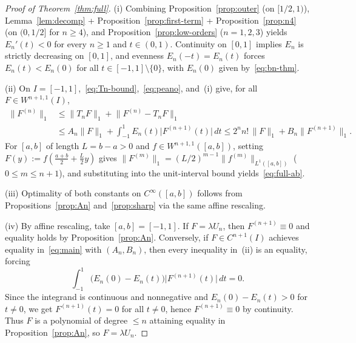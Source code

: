 \documentclass[11pt,a4paper]{article}
\newcommand{\Lone}[1]{\lVert #1\rVert_1}
\theoremstyle{remark}
\numberwithin{equation}{section}
\begin{document}
\begin{proof}[Proof of Theorem~\ref{thm:full}]
(i) Combining Proposition~\ref{prop:outer} (on $[1/2, 1)$), Lemma~\ref{lem:decomp} + Proposition~\ref{prop:first-term} + Proposition~\ref{prop:n4} (on $(0, 1/2]$ for $n \ge 4$), and Proposition~\ref{prop:low-orders} ($n = 1, 2, 3$) yields $E_n'(t) < 0$ for every $n \ge 1$ and $t \in (0,1)$. Continuity on $[0,1]$ implies $E_n$ is strictly decreasing on $[0,1]$, and evenness $E_n(-t) = E_n(t)$ forces $E_n(t) < E_n(0)$ for all $t \in [-1,1] \setminus \{0\}$, with $E_n(0)$ given by~\eqref{eq:bn-thm}.

(ii) On $I = [-1,1]$,~\eqref{eq:Tn-bound},~\eqref{eq:peano}, and~(i) give, for all $F \in W^{n+1,1}(I)$,
\begin{align*}
    \Lone{F^{(n)}}
    &\le \Lone{T_n F} + \Lone{F^{(n)} - T_n F} \\
    &\le A_n\Lone{F} + \int_{-1}^{1} E_n(t)\bigl|F^{(n+1)}(t)\bigr|\,dt
     \le 2^n n!\,\Lone{F} + B_n\Lone{F^{(n+1)}}.
\end{align*}
For $[a,b]$ of length $L = b - a > 0$ and $f \in W^{n+1,1}([a,b])$, setting $F(y) := f(\frac{a+b}{2} + \frac{L}{2}y)$ gives $\Lone{F^{(m)}} = (L/2)^{m-1}\lVert f^{(m)}\rVert_{L^1([a,b])}$ ($0 \le m \le n+1$), and substituting into the unit-interval bound yields~\eqref{eq:full-ab}.

(iii) Optimality of both constants on $C^\infty([a,b])$ follows from Propositions~\ref{prop:An} and~\ref{prop:sharp} via the same affine rescaling.

(iv) By affine rescaling, take $[a,b] = [-1,1]$. If $F = \lambda U_n$, then $F^{(n+1)} \equiv 0$ and equality holds by Proposition~\ref{prop:An}. Conversely, if $F \in C^{n+1}(I)$ achieves equality in~\eqref{eq:main} with $(A_n, B_n)$, then every inequality in~(ii) is an equality, forcing
\[
    \int_{-1}^{1} \bigl(E_n(0) - E_n(t)\bigr)\bigl|F^{(n+1)}(t)\bigr|\,dt = 0.
\]
Since the integrand is continuous and nonnegative and $E_n(0) - E_n(t) > 0$ for $t \neq 0$, we get $F^{(n+1)}(t) = 0$ for all $t \neq 0$, hence $F^{(n+1)} \equiv 0$ by continuity. Thus $F$ is a polynomial of degree $\le n$ attaining equality in Proposition~\ref{prop:An}, so $F = \lambda U_n$.
\end{proof}
\end{document}
